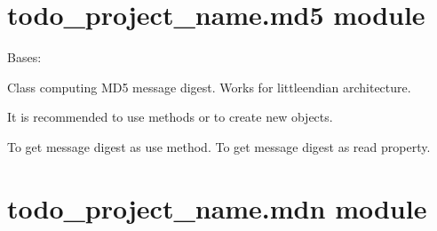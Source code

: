 \documentclass[letterpaper,10pt,english]{sphinxmanual}
\begin{document}
\section{todo\_project\_name.md5 module}
\label{\detokenize{todo_project_name:module-todo_project_name.md5}}\label{\detokenize{todo_project_name:todo-project-name-md5-module}}

\begin{fulllineitems}
\label{\detokenize{todo_project_name:todo_project_name.md5.MD5}}
\pysigstartsignatures
{}
\pysigstopsignatures
\sphinxAtStartPar
Bases: {\hyperref[\detokenize{todo_project_name:todo_project_name.mdn.MDN}]{}}

\sphinxAtStartPar
Class computing MD5 message digest. Works for little\sphinxhyphen{}endian architecture.

\sphinxAtStartPar
It is recommended to use methods  or 
to create new objects.

\sphinxAtStartPar
To get message digest as  use  method.
To get message digest as  read  property.


\end{fulllineitems}



\section{todo\_project\_name.mdn module}
\label{\detokenize{todo_project_name:module-todo_project_name.mdn}}\label{\detokenize{todo_project_name:todo-project-name-mdn-module}}
\end{document}
